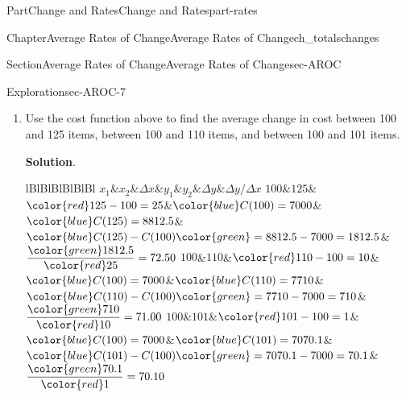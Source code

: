 \documentclass[oneside,10pt,]{tufte-book}
\newcommand{\blocktitlefont}{\relax}
\newcommand{\tabularfont}{\relax}
\numberwithin{equation}{chapter}
\newcommand{\hrulemedium}{\noalign{\hrule height 0.07em}}
\begin{document}
\begin{partptx}{Part}{Change and Rates}{}{Change and Rates}{}{}{part-rates}
\begin{chapterptx}{Chapter}{Average Rates of Change}{}{Average Rates of Change}{}{}{ch_totalschanges}
\begin{sectionptx}{Section}{Average Rates of Change}{}{Average Rates of Change}{}{}{sec-AROC}
\begin{exploration}{Exploration}{}{sec-AROC-7}
\begin{enumerate}[font=\bfseries,label=(\alph*),ref=\alph*]
. Dividing the total cost \(\Delta C\) evenly among the \(\Delta x\) items results in an \emph{average} cost per item of%
\begin{equation*}
\dfrac{\Delta C}{\Delta x} = \dfrac{3,750}{50} = 75 \frac{\$}{\text{item}}
\end{equation*}
%
\par
There were a lot of parts of this calculation.  You can either use a the definition \(\dfrac{\Delta C}{\Delta x} = \dfrac{C(x_2) - C(x_1)}{x_2 - x_1} \) which is a single formula that combines all of these steps, or you can organize the different parts separately using the table below. This is called an Average Rate of Change table, often abbreviated AROC. \begin{center}%
{\tabularfont%
\begin{tabular}{lBlBlBlBlBlBl}
\(x_1\)&\(x_2\)&\(\Delta x\)&\(y_1\)&\(y_2\)&\(\Delta y\)&\(\Delta y/\Delta x\)\tabularnewline\hrulemedium
\(100\)&\(150\)&\(50\)&\(7000\)&\(10750\)&\(3750\)&\(75\)
\end{tabular}
}%
\end{center}%
%
\item\label{task_costfunctionwithdecreasingquantity}Use the cost function above to find the average change in cost between 100 and 125 items, between 100 and 110 items, and between 100 and 101 items.%
\par\smallskip%
\noindent\textbf{\blocktitlefont Solution}.\hypertarget{task_costfunctionwithdecreasingquantity-2}{}\quad{}\begin{center}%
{\tabularfont%
\begin{tabular}{lBlBlBlBlBlBl}
\(x_1\)&\(x_2\)&\(\Delta x\)&\(y_1\)&\(y_2\)&\(\Delta y\)&\(\Delta y/\Delta x\)\tabularnewline\hrulemedium
\(100\)&\(125\)&\(\color{red} 	125 - 100 = 25\)&\(\color{blue} C(100) = 7000\)&\(\color{blue} C(125) = 8812.5\)&\(\color{blue} C(125) - C(100) \color{green} = 8812.5 - 7000 = 1812.5 \)&\(\dfrac{\color{green} 1812.5}{\color{red} 25} = 72.50  \)\tabularnewline\hrulemedium
\(100\)&\(110\)&\(\color{red} 	110 - 100 = 10\)&\(\color{blue} C(100) = 7000\)&\(\color{blue} C(110) = 7710 \)&\(\color{blue} C(110) - C(100) \color{green} = 7710 - 7000 = 710 \)&\(\dfrac{\color{green} 710}{\color{red} 10} = 71.00  \)\tabularnewline\hrulemedium
\(100\)&\(101\)&\(\color{red} 	101 - 100 = 1\)&\(\color{blue} C(100) = 7000\)&\(\color{blue} C(101) = 7070.1\)&\(\color{blue} C(101) - C(100) \color{green} =  7070.1 - 7000 = 70.1\)&\(\dfrac{\color{green} 70.1}{\color{red} 1} =  70.10 \)
\end{tabular}
}
\end{center}
\end{enumerate}
\end{exploration}
\end{sectionptx}
\end{chapterptx}
\end{partptx}
\end{document}
